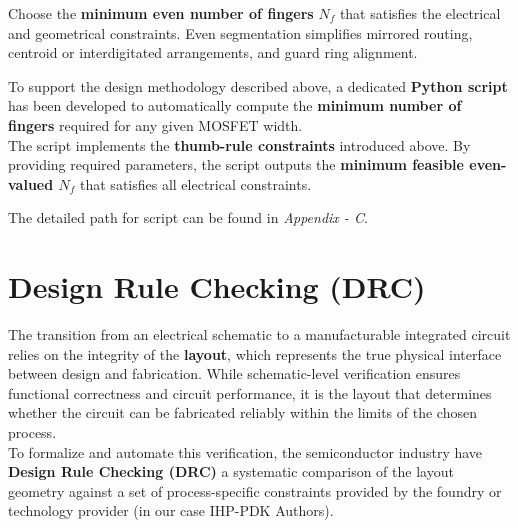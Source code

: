 \documentclass[
  11pt,
  a4paper,
  oneside]{scrbook}
\begin{document}
Choose the \textbf{minimum even number of fingers} \(N_f\) that
satisfies the electrical and geometrical constraints. Even segmentation
simplifies mirrored routing, centroid or interdigitated arrangements,
and guard ring alignment.

\begin{tcolorbox}[enhanced jigsaw, opacityback=0, breakable, colback=white, left=2mm, toprule=.15mm, arc=.35mm, coltitle=black, leftrule=.75mm, colbacktitle=quarto-callout-note-color!10!white, rightrule=.15mm, colframe=quarto-callout-note-color-frame, titlerule=0mm, title=\textcolor{quarto-callout-note-color}{\faInfo}\hspace{0.5em}{Number of fingers Calculation using Python Script}, toptitle=1mm, bottomtitle=1mm, bottomrule=.15mm, opacitybacktitle=0.6]

To support the design methodology described above, a dedicated
\textbf{Python script} has been developed to automatically compute the
\textbf{minimum number of fingers} required for any given MOSFET
width.\\
The script implements the \textbf{thumb-rule constraints} introduced
above. By providing required parameters, the script outputs the
\textbf{minimum feasible even-valued \(N_f\)} that satisfies all
electrical constraints.

The detailed path for script can be found in \emph{Appendix - C}.

\end{tcolorbox}

\chapter{Design Rule Checking (DRC)}\label{design-rule-checking-drc}

The transition from an electrical schematic to a manufacturable
integrated circuit relies on the integrity of the \textbf{layout}, which
represents the true physical interface between design and fabrication.
While schematic-level verification ensures functional correctness and
circuit performance, it is the layout that determines whether the
circuit can be fabricated reliably within the limits of the chosen
process.\\
To formalize and automate this verification, the semiconductor industry
have \textbf{Design Rule Checking (DRC)} a systematic comparison of the
layout geometry against a set of process-specific constraints provided
by the foundry or technology provider (in our case IHP-PDK Authors).
\end{document}
